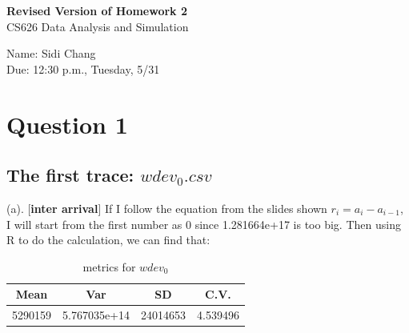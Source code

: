 \documentclass[11pt]{article}
\begin{document}
\pagestyle{empty}

\begin{Large}
\begin{center}
{\bf Revised Version of Homework 2}\\
CS626 Data Analysis and Simulation
\end{center}
\end{Large}
\begin{large}
\begin{center}
Name: Sidi Chang\\
Due: 12:30 p.m., Tuesday, 5/31
\end{center}
\end{large}
\section{Question 1}
\subsection{The first trace: $wdev_0.csv$}
(a). [\textbf{inter arrival}] If I follow the equation from the slides shown $r_i=a_i-a_{i-1}$, I will start from the first number as 0 since 1.281664e+17 is too big. Then using R to do the calculation, we can find that: \\
\begin{table}[htdp]
\caption{metrics for $wdev_0$}
\begin{center}
\begin{tabular}{c|c|c|c}
\hline
Mean & Var & SD & C.V. \\
\hline
5290159 & 5.767035e+14 & 24014653 & 4.539496 \\
\hline
\end{tabular}
\end{center}
\label{metrics for $wdev_0$}
\end{table}%
\end{document}
